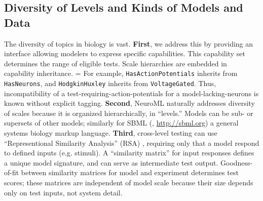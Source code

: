 \documentclass{frontiersSCNS}
\let\verbx\lstinline
\begin{document}
\subsection{Diversity of Levels and Kinds of Models and Data}
The diversity of topics in biology is vast. 
\textbf{First}, we address this by providing an interface allowing modelers to express specific capabilities.  
This capability set determines the range of eligible tests.  Scale hierarchies are embedded in capability inheritance.  =
For example, \verbx{HasActionPotentials} inherits from \verbx{HasNeurons}, and \verbx{HodgkinHuxley} inherits from \verbx{VoltageGated}. 
Thus, incompatibility of a test-requiring-action-potentials for a model-lacking-neurons is known without explicit tagging. 
\textbf{Second}, NeuroML naturally addresses diversity of scales because it is organized hierarchically, in ``levels.''  
Models can be sub- or supersets of other models; similarly for SBML (\cite{hucka_systems_2003}, \url{http://sbml.org}) a general systems biology markup language. 
\textbf{Third}, cross-level testing can use ``Representional Similarity Analysis'' (RSA) \citep{kriegeskorte_representational_2008}, requiring only that a model respond to defined inputs (e.g. stimuli). 
A ``similarity matrix'' for input responses defines a unique model signature, and can serve as intermediate test output. 
Goodness-of-fit between similarity matrices for model and experiment determines test scores; 
these matrices are independent of model scale because their size depends only on test inputs, not system detail.  
\end{document}
